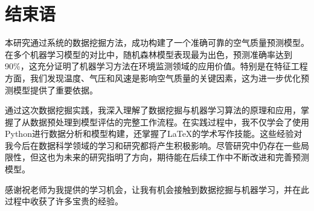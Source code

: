 \section{结束语}

本研究通过系统的数据挖掘方法，成功构建了一个准确可靠的空气质量预测模型。在多个机器学习模型的对比中，随机森林模型表现最为出色，预测准确率达到90\%，这充分证明了机器学习方法在环境监测领域的应用价值。特别是在特征工程方面，我们发现温度、气压和风速是影响空气质量的关键因素，这为进一步优化预测模型提供了重要依据。

通过这次数据挖掘实践，我深入理解了数据挖掘与机器学习算法的原理和应用，掌握了从数据预处理到模型评估的完整工作流程。在实践过程中，我不仅学会了使用Python进行数据分析和模型构建，还掌握了LaTeX的学术写作技能。这些经验对我今后在数据科学领域的学习和研究都将产生积极影响。尽管研究中仍存在一些局限性，但这也为未来的研究指明了方向，期待能在后续工作中不断改进和完善预测模型。

感谢祝老师为我提供的学习机会，让我有机会接触到数据挖掘与机器学习，并在此过程中收获了许多宝贵的经验。

